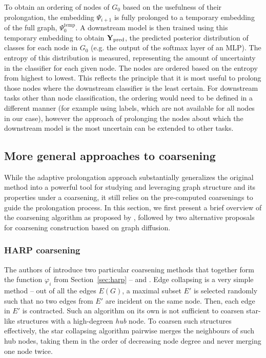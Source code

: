 To obtain an ordering of nodes of \( G_0 \) based on the usefulness of their prolongation, the embedding \( \Psi_{i + 1} \) is fully prolonged to a temporary embedding of the full graph, \( \Psi_0^\mathrm{temp} \). A downstream model is then trained using this temporary embedding to obtain \( \mathbf{Y}_\mathrm{pred} \), the predicted posterior distribution of classes for each node in \( G_0 \) (e.g. the output of the softmax layer of an MLP). The entropy of this distribution is measured, representing the amount of uncertainty in the classifier for each given node. The nodes are ordered based on the entropy from highest to lowest. This reflects the principle that it is most useful to prolong those nodes where the downstream classifier is the least certain. For downstream tasks other than node classification, the ordering would need to be defined in a different manner (for example using labels, which are not available for all nodes in our case), however the approach of prolonging the nodes about which the downstream model is the most uncertain can be extended to other tasks.

\subsection{More general approaches to coarsening}\label{sec:coarsening-algorithms}

While the adaptive prolongation approach substantially generalizes the original method into a powerful tool for studying and leveraging graph structure and its properties under a coarsening, it still relies on the pre-computed coarsenings to guide the prolongation process. In this section, we first present a brief overview of the coarsening algorithm as proposed by \cite{chen_harp_2018}, followed by two alternative proposals for coarsening construction based on graph diffusion.

\subsubsection{HARP coarsening}\label{sec:harp-coarsening}

The authors of \cite{chen_harp_2018} introduce two particular coarsening methods that together form the function \( \varphi_i \) from Section~\ref{sec:harp} --  and . Edge collapsing is a very simple method -- out of all the edges \( E \left( G \right) \), a maximal subset \( E' \) is selected randomly such that no two edges from \( E' \) are incident on the same node. Then, each edge in \( E' \) is contracted. Such an algorithm on its own is not sufficient to coarsen star-like structures with a high-degreen \textit{hub} node. To coarsen such structures effectively, the star collapsing algorithm pairwise merges the neighbours of such hub nodes, taking them in the order of decreasing node degree and never merging one node twice.

